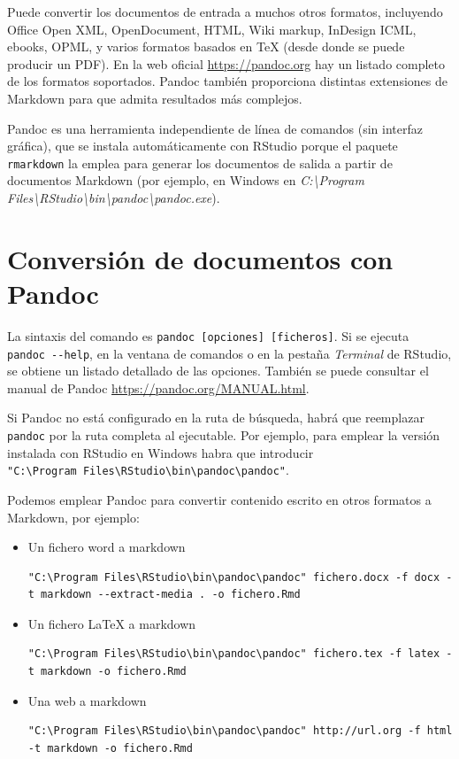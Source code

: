 \documentclass[]{book}
\theoremstyle{definition}
\theoremstyle{definition}
\theoremstyle{definition}
\theoremstyle{remark}
\begin{document}
Puede convertir los documentos de entrada a muchos otros formatos,
incluyendo Office Open XML, OpenDocument, HTML, Wiki markup, InDesign
ICML, ebooks, OPML, y varios formatos basados en TeX (desde donde se
puede producir un PDF). En la web oficial \url{https://pandoc.org} hay
un listado completo de los formatos soportados. Pandoc también
proporciona distintas extensiones de Markdown para que admita resultados
más complejos.

Pandoc es una herramienta independiente de línea de comandos (sin
interfaz gráfica), que se instala automáticamente con RStudio porque el
paquete \texttt{rmarkdown} la emplea para generar los documentos de
salida a partir de documentos Markdown (por ejemplo, en Windows en
\emph{C:\textbackslash{}Program
Files\textbackslash{}RStudio\textbackslash{}bin\textbackslash{}pandoc\textbackslash{}pandoc.exe}).

\section{Conversión de documentos con Pandoc}\label{conversion}

La sintaxis del comando es
\texttt{pandoc\ {[}opciones{]}\ {[}ficheros{]}}. Si se ejecuta
\texttt{pandoc\ -\/-help}, en la ventana de comandos o en la pestaña
\emph{Terminal} de RStudio, se obtiene un listado detallado de las
opciones. También se puede consultar el manual de Pandoc
\url{https://pandoc.org/MANUAL.html}.

Si Pandoc no está configurado en la ruta de búsqueda, habrá que
reemplazar \texttt{pandoc} por la ruta completa al ejecutable. Por
ejemplo, para emplear la versión instalada con RStudio en Windows habra
que introducir
\texttt{"C:\textbackslash{}Program\ Files\textbackslash{}RStudio\textbackslash{}bin\textbackslash{}pandoc\textbackslash{}pandoc"}.

Podemos emplear Pandoc para convertir contenido escrito en otros
formatos a Markdown, por ejemplo:

\begin{itemize}
\item
  Un fichero word a markdown

\begin{verbatim}
"C:\Program Files\RStudio\bin\pandoc\pandoc" fichero.docx -f docx -t markdown --extract-media . -o fichero.Rmd 
\end{verbatim}
\item
  Un fichero LaTeX a markdown

\begin{verbatim}
"C:\Program Files\RStudio\bin\pandoc\pandoc" fichero.tex -f latex -t markdown -o fichero.Rmd 
\end{verbatim}
\item
  Una web a markdown

\begin{verbatim}
"C:\Program Files\RStudio\bin\pandoc\pandoc" http://url.org -f html -t markdown -o fichero.Rmd
\end{verbatim}
\end{itemize}
\end{document}
